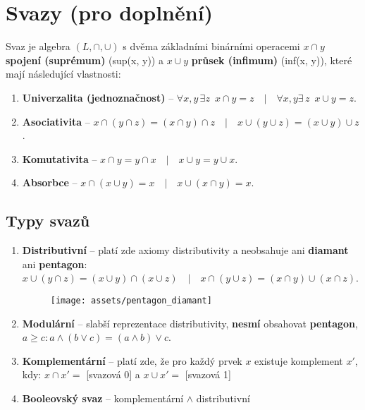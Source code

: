 \section{Svazy (pro doplnění)}
Svaz je algebra $(L, \cap, \cup)$ s dvěma základními binárními operacemi $x\cap{}y$ \textbf{spojení (suprémum)} (sup(x, y)) a $x\cup{}y$ \textbf{průsek (infimum)} (inf(x, y)), které mají následující vlastnosti:
\begin{enumerate}
    \item \textbf{Univerzalita (jednoznačnost)} -- $\forall x,y \,\exists z \,\,\, x \cap y = z\quad|\quad\forall x,y \exists\, z \,\,\, x \cup y = z$.
    \item \textbf{Asociativita} -- $x \cap (y \cap z) = (x \cap y) \cap z \quad|\quad x \cup (y \cup z) = (x \cup y) \cup z$.
    \item \textbf{Komutativita} -- $x \cap y = y \cap x \quad|\quad x \cup y = y \cup x$.
    \item \textbf{Absorbce} -- $x \cap (x \cup y) = x \quad|\quad x \cup (x \cap y) = x $.
\end{enumerate}

\subsection{Typy svazů}
\begin{enumerate}
    \item \textbf{Distributivní} -- platí zde axiomy distributivity a neobsahuje ani \textbf{diamant} ani \textbf{pentagon}: $x \cup (y \cap z) = (x \cup y) \cap (x \cup z) \quad|\quad x \cap (y \cup z) = (x \cap y) \cup (x \cap z) $.

          \begin{figure}[H]
              \centering
              \texttt{[image: assets/pentagon\_diamant]}
          \end{figure}
    \item \textbf{Modulární} -- slabší reprezentace distributivity, \textbf{nesmí} obsahovat \textbf{pentagon}, $a \geq c: a \land (b \lor c) = (a \land b) \lor c$.
    \item \textbf{Komplementární} -- platí zde, že pro každý prvek $ x $ existuje komplement $x' $, kdy: $x \cap x' = $ [svazová 0] a $x \cup x' = $ [svazová 1]
    \item \textbf{Booleovský svaz} -- komplementární $\land$ distributivní
\end{enumerate}

